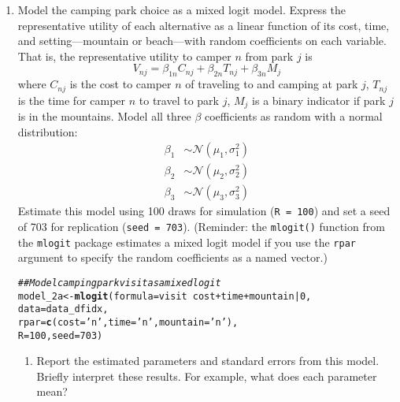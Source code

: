 \documentclass[11pt,letterpaper]{article}\usepackage[]{graphicx}\usepackage[]{xcolor}
\makeatletter
\newcommand{\hlnum}[1]{\textcolor[rgb]{0.686,0.059,0.569}{#1}}%
\newcommand{\hlstr}[1]{\textcolor[rgb]{0.192,0.494,0.8}{#1}}%
\newcommand{\hlcom}[1]{\textcolor[rgb]{0.678,0.584,0.686}{\textit{#1}}}%
\newcommand{\hlopt}[1]{\textcolor[rgb]{0,0,0}{#1}}%
\newcommand{\hlstd}[1]{\textcolor[rgb]{0.345,0.345,0.345}{#1}}%
\newcommand{\hlkwb}[1]{\textcolor[rgb]{0.69,0.353,0.396}{#1}}%
\newcommand{\hlkwc}[1]{\textcolor[rgb]{0.333,0.667,0.333}{#1}}%
\newcommand{\hlkwd}[1]{\textcolor[rgb]{0.737,0.353,0.396}{\textbf{#1}}}%
\newenvironment{kframe}{%
 \def\at@end@of@kframe{}%
 \ifinner\ifhmode%
  \def\at@end@of@kframe{\end{minipage}}%
  \begin{minipage}{\columnwidth}%
 \fi\fi%
 \def\FrameCommand##1{\hskip\@totalleftmargin \hskip-\fboxsep
 \colorbox{shadecolor}{##1}\hskip-\fboxsep
     \hskip-\linewidth \hskip-\@totalleftmargin \hskip\columnwidth}%
 \MakeFramed {\advance\hsize-\width
   \@totalleftmargin\z@ \linewidth\hsize
   \@setminipage}}%
 {\par\unskip\endMakeFramed%
 \at@end@of@kframe}
\newenvironment{knitrout}{}{} %
\makeatother
\begin{document}
\begin{enumerate}[label=\alph*., leftmargin=*]

	\item Model the camping park choice as a mixed logit model. Express the representative utility of each alternative as a linear function of its cost, time, and setting---mountain or beach---with random coefficients on each variable. That is, the representative utility to camper $n$ from park $j$ is
	$$V_{nj} = \beta_{1n} C_{nj} + \beta_{2n} T_{nj} + \beta_{3n} M_j$$
	where $C_{nj}$ is the cost to camper $n$ of traveling to and camping at park $j$, $T_{nj}$ is the time for camper $n$ to travel to park $j$, $M_j$ is a binary indicator if park $j$ is in the mountains. Model all three $\beta$ coefficients as random with a normal distribution:
	\begin{align*}
		\beta_1 & \sim \mathcal{N}(\mu_1, \sigma_1^2) \\
		\beta_2 & \sim \mathcal{N}(\mu_2, \sigma_2^2) \\
		\beta_3 & \sim \mathcal{N}(\mu_3, \sigma_3^2)
	\end{align*}
	Estimate this model using 100 draws for simulation (\texttt{R = 100}) and set a seed of 703 for replication (\texttt{seed = 703}). (Reminder: the \texttt{mlogit()} function from the \texttt{mlogit} package estimates a mixed logit model if you use the \texttt{rpar} argument to specify the random coefficients as a named vector.)

\begin{knitrout}
\color{fgcolor}\begin{kframe}
\begin{alltt}
\hlcom{## Model camping park visit as a mixed logit}
\hlstd{model_2a} \hlkwb{<-} \hlkwd{mlogit}\hlstd{(}\hlkwc{formula} \hlstd{= visit} \hlopt{~} \hlstd{cost} \hlopt{+} \hlstd{time} \hlopt{+} \hlstd{mountain} \hlopt{|} \hlnum{0}\hlstd{,}
                   \hlkwc{data} \hlstd{= data_dfidx,}
                   \hlkwc{rpar} \hlstd{=} \hlkwd{c}\hlstd{(}\hlkwc{cost} \hlstd{=} \hlstr{'n'}\hlstd{,} \hlkwc{time} \hlstd{=} \hlstr{'n'}\hlstd{,} \hlkwc{mountain} \hlstd{=} \hlstr{'n'}\hlstd{),}
                   \hlkwc{R} \hlstd{=} \hlnum{100}\hlstd{,} \hlkwc{seed} \hlstd{=} \hlnum{703}\hlstd{)}
\end{alltt}
\end{kframe}
\end{knitrout}

	\begin{enumerate}[label=\roman*.]
		\item Report the estimated parameters and standard errors from this model. Briefly interpret these results. For example, what does each parameter mean?


\end{enumerate}
\end{enumerate}
\end{document}
